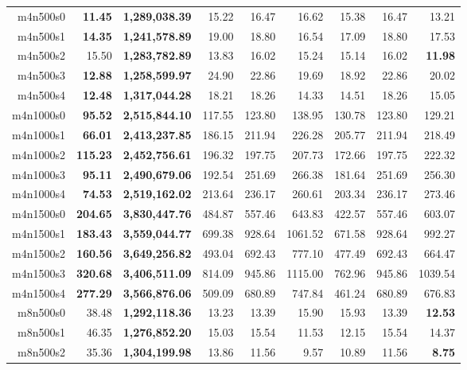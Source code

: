 \documentclass{article}
\begin{document}
\begin{table}[!htb]
\begin{tabular}{rrrrrrrrr}
      m4n500s0 & \textbf{11.45} & \textbf{1,289,038.39} & 15.22 & 16.47 & 16.62 & 15.38 & 16.47 & 13.21 \\
      m4n500s1 & \textbf{14.35} & \textbf{1,241,578.89} & 19.00 & 18.80 & 16.54 & 17.09 & 18.80 & 17.53 \\
      m4n500s2 & 15.50 & \textbf{1,283,782.89} & 13.83 & 16.02 & 15.24 & 15.14 & 16.02 & \textbf{11.98} \\
      m4n500s3 & \textbf{12.88} & \textbf{1,258,599.97} & 24.90 & 22.86 & 19.69 & 18.92 & 22.86 & 20.02 \\
      m4n500s4 & \textbf{12.48} & \textbf{1,317,044.28} & 18.21 & 18.26 & 14.33 & 14.51 & 18.26 & 15.05 \\
      m4n1000s0 & \textbf{95.52} & \textbf{2,515,844.10} & 117.55 & 123.80 & 138.95 & 130.78 & 123.80 & 129.21 \\
      m4n1000s1 & \textbf{66.01} & \textbf{2,413,237.85} & 186.15 & 211.94 & 226.28 & 205.77 & 211.94 & 218.49 \\
      m4n1000s2 & \textbf{115.23} & \textbf{2,452,756.61} & 196.32 & 197.75 & 207.73 & 172.66 & 197.75 & 222.32 \\
      m4n1000s3 & \textbf{95.11} & \textbf{2,490,679.06} & 192.54 & 251.69 & 266.38 & 181.64 & 251.69 & 256.30 \\
      m4n1000s4 & \textbf{74.53} & \textbf{2,519,162.02} & 213.64 & 236.17 & 260.61 & 203.34 & 236.17 & 273.46 \\
      m4n1500s0 & \textbf{204.65} & \textbf{3,830,447.76} & 484.87 & 557.46 & 643.83 & 422.57 & 557.46 & 603.07 \\
      m4n1500s1 & \textbf{183.43} & \textbf{3,559,044.77} & 699.38 & 928.64 & 1061.52 & 671.58 & 928.64 & 992.27 \\
      m4n1500s2 & \textbf{160.56} & \textbf{3,649,256.82} & 493.04 & 692.43 & 777.10 & 477.49 & 692.43 & 664.47 \\
      m4n1500s3 & \textbf{320.68} & \textbf{3,406,511.09} & 814.09 & 945.86 & 1115.00 & 762.96 & 945.86 & 1039.54 \\
      m4n1500s4 & \textbf{277.29} & \textbf{3,566,876.06} & 509.09 & 680.89 & 747.84 & 461.24 & 680.89 & 676.83 \\
      \midrule
      m8n500s0 & 38.48 & \textbf{1,292,118.36} & 13.23 & 13.39 & 15.90 & 15.93 & 13.39 & \textbf{12.53} \\
      m8n500s1 & 46.35 & \textbf{1,276,852.20} & 15.03 & 15.54 & 11.53 & 12.15 & 15.54 & 14.37 \\
      m8n500s2 & 35.36 & \textbf{1,304,199.98} & 13.86 & 11.56 & 9.57 & 10.89 & 11.56 & \textbf{8.75} \\

\end{tabular}
\end{table}
\end{document}
